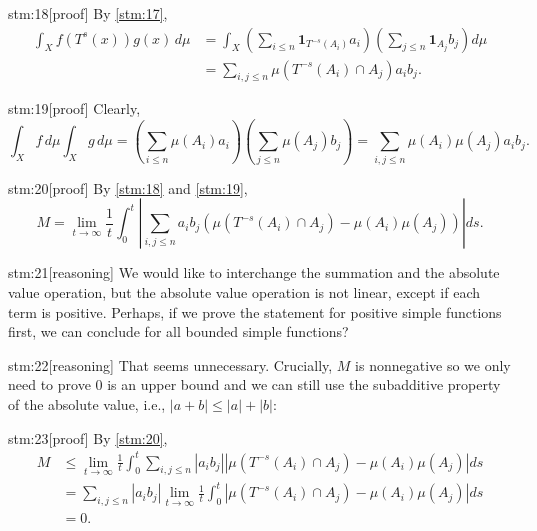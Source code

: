 \begin{stm}{stm:18}[proof]
By \ref{stm:17},
\begin{align*}
\int_X f(T^s(x))g(x) \, d\mu &= \int_X \left( \sum_{i \leq n} \mathbf{1}_{T^{-s}(A_i)} a_i \right) \left( \sum_{j \leq n} \mathbf{1}_{A_j} b_j \right) d\mu \\
&= \sum_{i,j \leq n} \mu(T^{-s}(A_i) \cap A_j) a_i b_j.
\end{align*}
\end{stm}

\begin{stm}{stm:19}[proof]
Clearly,
\[
\int_X f \, d\mu \int_X g \, d\mu = \left( \sum_{i \leq n} \mu(A_i) a_i \right) \left( \sum_{j \leq n} \mu(A_j) b_j \right) = \sum_{i,j \leq n} \mu(A_i)\mu(A_j) a_i b_j.
\]
\end{stm}

\begin{stm}{stm:20}[proof]
By \ref{stm:18} and \ref{stm:19},
\[
M= \lim_{t \to \infty} \frac{1}{t} \int_0^t \left| \sum_{i,j \leq n} a_i b_j \left( \mu(T^{-s}(A_i) \cap A_j) - \mu(A_i)\mu(A_j) \right) \right| ds.
\]
\end{stm}

\begin{stm}{stm:21}[reasoning]
We would like to interchange the summation and the absolute value operation, but the absolute value operation is not linear, except if each term is positive. Perhaps, if we prove the statement for positive simple functions first, we can conclude for all bounded simple functions?
\end{stm}

\begin{stm}{stm:22}[reasoning]
That seems unnecessary. Crucially, $M$ is nonnegative so we only need to prove $0$ is an upper bound and we can still use the subadditive property of the absolute value, i.e., $|a + b| \leq |a| + |b|$:
\end{stm}

\begin{stm}{stm:23}[proof]
By \ref{stm:20},
\begin{align*}
M&\leq \lim_{t \to \infty} \frac{1}{t} \int_0^t \sum_{i,j \leq n} |a_i b_j| \left| \mu(T^{-s}(A_i) \cap A_j) - \mu(A_i)\mu(A_j) \right| ds \\
&= \sum_{i,j \leq n} |a_i b_j| \lim_{t \to \infty} \frac{1}{t} \int_0^t \left| \mu(T^{-s}(A_i) \cap A_j) - \mu(A_i)\mu(A_j) \right| ds \\
&= 0.
\end{align*}
\end{stm}

